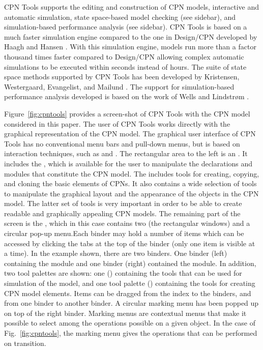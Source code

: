 CPN Tools supports the editing and construction of CPN models,
interactive and automatic simulation, state space-based model checking
(see sidebar), and simulation-based performance analysis (see
sidebar). CPN Tools is based on a much faster simulation engine
compared to the one in Design/CPN developed by Haagh and Hansen
\cite{X}. With this simulation engine, models run more than a factor
thousand times faster compared to Design/CPN allowing complex
automatic simulations to be executed within seconds instead of
hours. The suite of state space methods supported by CPN Tools has
been developed by Kristensen, Westergaard, Evangelist, and Mailund
\cite{X}. The support for simulation-based performance analysis
developed is based on the work of Wells and Lindstr\o{}m \cite{Y}.

Figure~\ref{fig:cpntools} provides a screen-shot of CPN Tools with the
CPN model considered in this paper. The user of CPN Tools works
directly with the graphical representation of the CPN model. The
graphical user interface of CPN Tools has no conventional menu bars
and pull-down menus, but is based on interaction techniques, such as
 and . The rectangular
area to the left is an . It includes the , which is available for the user to manipulate the declarations
and modules that constitute the CPN model. The 
includes tools for creating, copying, and cloning the basic elements
of CPNs. It also contains a wide selection of tools to manipulate the
graphical layout and the appearance of the objects in the CPN
model. The latter set of tools is very important in order to be able
to create readable and graphically appealing CPN models. The remaining
part of the screen is the , which in this case
contains two  (the rectangular windows) and a
circular pop-up menu.Each binder may hold a number of items which can be accessed by
clicking the tabs at the top of the binder (only one item is visible
at a time). In the example shown, there are two binders. One binder
(left) containing the  module and one binder (right)
contained the  module. In addition, two tool
palettes are shown: one () containing the tools that can
be used for simulation of the model, and one tool palette
() containing the tools for creating CPN model
elements. Items can be dragged from the index to the binders, and from
one binder to another binder. A circular marking menu has been popped
up on top of the right binder. Marking menus are contextual menus that
make it possible to select among the operations possible on a given
object. In the case of Fig.~\ref{fig:cpntools}, the marking
menu gives the operations that can be performed on transition.



